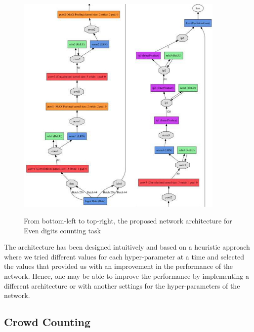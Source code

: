 


\begin{figure}[H]
  \centering
   {\includegraphics[width=0.9\textwidth]{images/ohoh}}
	\caption{From bottom-left to top-right, the proposed network architecture for Even digits counting task}
	\label{fig:l2cNet}
\end{figure}

The architecture has been designed intuitively and based on a heuristic approach where we tried different values for each hyper-parameter at a time and selected the values that provided us with an improvement in the performance of the network. Hence, one may be able to improve the performance by implementing a different architecture or with another settings for the hyper-parameters of the network. 

\subsection{Crowd Counting}
\label{subsec:ucsdarch}

